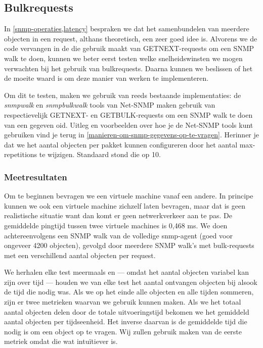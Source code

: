 \subsection{Bulkrequests}
\label{bulkrequests-benchmarks}

In \cref{snmp-operaties,latency} bespraken we dat het samenbundelen van meerdere objecten in een request, althans theoretisch, een zeer goed idee is.
Alvorens we de code vervangen in de \nwmretriever{} die gebruik maakt van GETNEXT-requests om een SNMP walk te doen,
kunnen we beter eerst testen welke snelheidswinsten we mogen verwachten bij het gebruik van bulkrequests.
Daarna kunnen we beslissen of het de moeite waard is om deze manier van werken te implementeren.

Om dit te testen, maken we gebruik van reeds bestaande implementaties:
de \textit{snmpwalk} en \mbox{\textit{snmpbulkwalk}} tools van Net-SNMP maken gebruik van respectievelijk GETNEXT- en
GETBULK-requests om een SNMP walk te doen van een gegeven \gls{oid}.
Uitleg en voorbeelden over hoe je de Net-SNMP tools kunt gebruiken vind je terug in \cref{manieren-om-snmp-gegevens-op-te-vragen}.
Herinner je dat we het aantal objecten per pakket kunnen configureren door het aantal max-repetitions te wijzigen.
Standaard stond die op 10.

\subsubsection{Meetresultaten}

Om te beginnen bevragen we een virtuele machine vanaf een andere.
In principe kunnen we ook een virtuele machine zichzelf laten bevragen, maar dat is geen realistische situatie want dan komt er geen netwerkverkeer aan te pas.
De gemiddelde pingtijd tussen twee virtuele machines is 0,468 ms.
We doen achtereenvolgens een SNMP walk van de volledige \gls{snmp-agent} (goed voor ongeveer 4200 objecten),
gevolgd door meerdere SNMP walk's met bulk-requests met een verschillend aantal objecten per request.

We herhalen elke test meermaals en --- omdat het aantal objecten variabel kan zijn over tijd ---
houden we van elke test het aantal ontvangen objecten bij alsook de tijd die nodig was.
Als we op het einde alle objecten en alle tijden sommeren, zijn er twee metrieken waarvan we gebruik kunnen maken.
Als we het totaal aantal objecten delen door de totale uitvoeringstijd bekomen we het gemiddeld aantal objecten per tijdseenheid.
Het inverse daarvan is de gemiddelde tijd die nodig is om een object op te vragen.
Wij zullen gebruik maken van de eerste metriek omdat die wat intuïtiever is.

